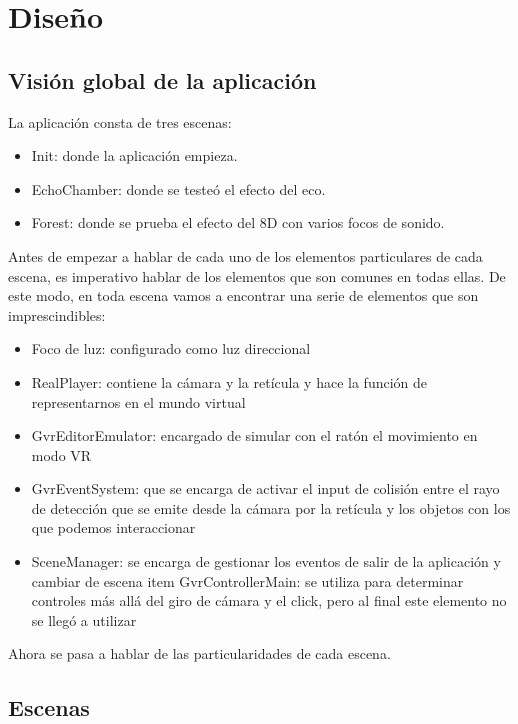 \section{Diseño}

\subsection{Visión global de la aplicación}

\quad La aplicación consta de tres escenas:\\

\begin{itemize}
	\item Init: donde la aplicación empieza.
	\item EchoChamber: donde se testeó el efecto del eco.
	\item Forest: donde se prueba el efecto del 8D con varios focos de sonido.
\end{itemize}

\quad Antes de empezar a hablar de cada uno de los elementos particulares de cada escena, es imperativo hablar de los elementos que son comunes en todas ellas. De este modo, en toda escena vamos a encontrar una serie de elementos que son imprescindibles: 
\begin{itemize}
	\item Foco de luz: configurado como luz direccional
	\item RealPlayer: contiene la cámara y la retícula y hace la función de representarnos en el mundo virtual
	\item GvrEditorEmulator: encargado de simular con el ratón el movimiento en modo VR
	\item GvrEventSystem: que se encarga de activar el input de colisión entre el rayo de detección que se emite desde la cámara por la retícula y los objetos con los que podemos interaccionar 
	\item SceneManager: se encarga de gestionar los eventos de salir de la aplicación y cambiar de escena
	item GvrControllerMain: se utiliza para determinar controles más allá del giro de cámara y el click, pero al final este elemento no se llegó a utilizar
\end{itemize}

\quad Ahora se pasa a hablar de las particularidades de cada escena.\\

\subsection{Escenas}
